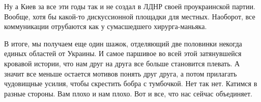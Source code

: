Ну а Киев за все эти годы так и не создал в ЛДНР своей проукраинской партии.
Вообще, хотя бы какой-то дискуссионной площадки для местных. Наоборот, все
коммуникации отрубаются как у сумасшедшего хирурга-маньяка.

В итоге, мы получаем еще один шажок, отделяющий две половинки некогда единых
областей от Украины. И самое паршивое во всей этой затянувшейся кровавой
истории, что нам друг на друга все больше становится плевать. А значит все
меньше остается мотивов понять друг друга, а потом прилагать чудовищные усилия,
чтобы скрестить бобра с тумбочкой. Нет так нет. Катимся в разные стороны. Вам
плохо и нам плохо. Вот и все, что нас сейчас объединяет.

